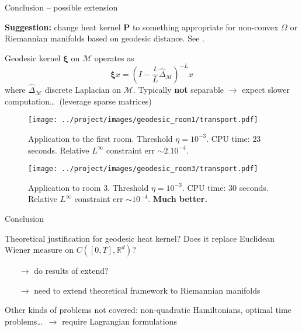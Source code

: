 \documentclass[xcolor={dvipsnames}]{beamer}
\newcommand{\RR}{\mathbb{R}}
\newcommand{\bfP}{\mathbf{P}}
\newcommand{\calM}{\mathcal{M}}
\newcommand{\greenfont}{\color{Green!90!black}}
\begin{document}
\begin{frame}{Conclusion -- possible extension}
	
	
	\textbf{Suggestion:} change heat kernel $\bfP$ to something appropriate for non-convex $\Omega$ or Riemannian manifolds based on geodesic distance. See \textcite{peyr2015entropic}.
	
	Geodesic kernel $\boldsymbol{\xi}$ on $\calM$ operates as
	\[
		\boldsymbol{\xi}x =
		\left(I - \frac{t}{L}\hat{\Delta}_\calM \right)^{-L}x
	\]
	where $\hat{\Delta}_\calM$ discrete Laplacian on $\calM$. Typically \textbf{not} separable $\rightarrow$ expect slower computation\ldots~(leverage sparse matrices)
	
	
\end{frame}

\begin{frame}
	\begin{figure}
		\texttt{[image: ../project/images/geodesic\_room1/transport.pdf]}
		\caption{Application to the first room. Threshold $\eta = 10^{-3}$. CPU time: $23$ seconds. Relative $L^\infty$ constraint err $\sim 2.10^{-4}$.}
	\end{figure}
\end{frame}

\begin{frame}
	\begin{figure}
		\texttt{[image: ../project/images/geodesic\_room3/transport.pdf]}
		\caption{Application to room 3. Threshold $\eta = 10^{-3}$. CPU time: $30$ seconds. Relative $L^\infty$ constraint err $\sim 10^{-4}$. {\greenfont\bfseries Much better.}}
	\end{figure}
\end{frame}
	

\begin{frame}{Conclusion}
	
	Theoretical justification for geodesic heat kernel? Does it replace Euclidean Wiener measure on $C([0,T], \RR^d)$?
	\begin{itemize}
		\item[$\rightarrow$] do results of \textcite{benamou2018entropy} extend?
		\item[$\rightarrow$] need to extend theoretical framework to Riemannian manifolds
	\end{itemize}
	
	
	Other kinds of problems not covered: non-quadratic Hamiltonians, optimal time problems\ldots~$\rightarrow$ require Lagrangian formulations
	
\end{frame}



\begin{frame}[allowframebreaks]	
	\printbibliography{}
\end{frame}
\end{document}
